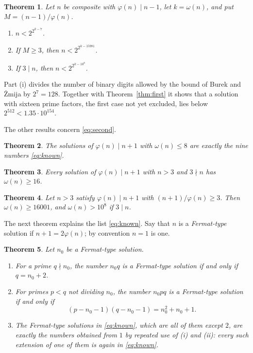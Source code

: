 \documentclass[11pt,reqno]{amsart}
\numberwithin{equation}{section}
\theoremstyle{plain}
\newtheorem{theorem}{Theorem}[section]
\theoremstyle{definition}
\theoremstyle{remark}
\begin{document}
\begin{theorem}\label{thm:size}
Let $n$ be composite with $\varphi(n)\mid n-1$, let $k=\omega(n)$, and
put $M=(n-1)/\varphi(n)$.
\begin{enumerate}[label=\textup{(\roman*)}]
\item $n<2^{2^{k-7}}$.
\item If $M\ge3$, then $n<2^{2^{k-15981}}$.
\item If $3\mid n$, then $n<2^{2^{k-10^8}}$.
\end{enumerate}
\end{theorem}

Part (i) divides the number of binary digits allowed by the bound of
Burek and \.Zmija by $2^7=128$. Together with Theorem~\ref{thm:first}
it shows that a solution with sixteen prime factors, the first case
not yet excluded, lies below $2^{512}<1.35\cdot10^{154}$.

The other results concern \eqref{eq:second}.

\begin{theorem}\label{thm:eight}
The solutions of $\varphi(n)\mid n+1$ with $\omega(n)\le8$ are exactly
the nine numbers \eqref{eq:known}.
\end{theorem}

\begin{theorem}\label{thm:coprime}
Every solution of $\varphi(n)\mid n+1$ with $n>3$ and $3\nmid n$ has
$\omega(n)\ge16$.
\end{theorem}

\begin{theorem}\label{thm:quotient}
Let $n>3$ satisfy $\varphi(n)\mid n+1$ with $(n+1)/\varphi(n)\ge3$.
Then $\omega(n)\ge16001$, and $\omega(n)>10^8$ if $3\mid n$.
\end{theorem}

The next theorem explains the list \eqref{eq:known}. Say that $n$ is a
\emph{Fermat-type} solution if $n+1=2\varphi(n)$; by convention $n=1$
is one.

\begin{theorem}\label{thm:ext}
Let $n_0$ be a Fermat-type solution.
\begin{enumerate}[label=\textup{(\roman*)}]
\item For a prime $q\nmid n_0$, the number $n_0q$ is a Fermat-type
  solution if and only if $q=n_0+2$.
\item For primes $p<q$ not dividing $n_0$, the number $n_0pq$ is a
  Fermat-type solution if and only if
  \[
    (p-n_0-1)(q-n_0-1)=n_0^2+n_0+1 .
  \]
\item The Fermat-type solutions in \eqref{eq:known}, which are all
  of them except $2$, are exactly the numbers obtained from $1$ by
  repeated use of \textup{(i)} and \textup{(ii)}: every such extension
  of one of them is again in \eqref{eq:known}.
\end{enumerate}
\end{theorem}
\end{document}
